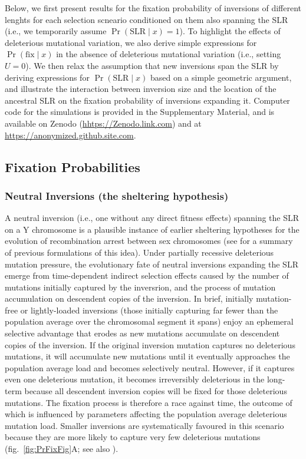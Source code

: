 \documentclass{article}[12pt]
\begin{document}
Below, we first present results for the fixation probability of inversions of different lenghts for each selection scneario conditioned on them also spanning the SLR (i.e., we temporarily assume $\Pr(\text{SLR} \mid x) = 1$). To highlight the effects of deleterious mutational variation, we also derive simple expressions for $\Pr(\text{fix} \mid x)$ in the absence of deleterious mutational variation (i.e., setting $U = 0$). We then relax the assumption that new inversions span the SLR by deriving expressions for $\Pr(\text{SLR} \mid x)$ based on a simple geometric argument, and illustrate the interaction between inversion size and the location of the ancestral SLR on the fixation probability of inversions expanding it. Computer code for the simulations is provided in the Supplementary Material, and is available on Zenodo (\url{hhtps://Zenodo.link.com}) and at \url{https://anonymized.github.site.com}. %



\subsection*{Fixation Probabilities}

\subsubsection*{Neutral Inversions (the sheltering hypothesis)}

A neutral inversion (i.e., one without any direct fitness effects) spanning the SLR on a Y chromosome is a plausible instance of earlier sheltering hypotheses for the evolution of recombination arrest between sex chromosomes (see \citealt[][]{Olito-etal-2022} for a summary of previous formulations of this idea). Under partially recessive deleterious mutation pressure, the evolutionary fate of neutral inversions expanding the SLR emerge from time-dependent indirect selection effects caused by the number of mutations initially captured by the inversrion, and the process of mutation accumulation on descendent copies of the inversion. In brief, initially mutation-free or lightly-loaded inversions (those initially capturing far fewer than the population average over the chromosomal segment it spans) enjoy an ephemeral selective advantage that erodes as new mutations accumulate on descendent copies of the inversion. If the original inversion mutation captures no deleterious mutations, it will accumulate new mutations until it eventually approaches the population average load and becomes selectively neutral. However, if it captures even one deleterious mutation, it becomes irreversibly deleterious in the long-term because all descendent inversion copies will be fixed for those deleterious mutations. The fixation process is therefore a race against time, the outcome of which is influenced by parameters affecting the population average deleterious mutation load. Smaller inversions are systematically favoured in this scenario because they are more likely to capture very few deleterious mutations (fig.~\ref{fig:PrFixFig}A; see also \citealt{Olito-etal-2022}). 
\end{document}
